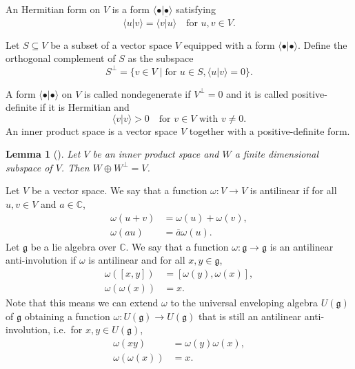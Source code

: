 \documentclass[a4paper, 12pt, reqno]{amsart}
\newtheorem{lemma}[theorem]{Lemma}
\theoremstyle{remark}
\numberwithin{equation}{subsection}
\begin{document}
An Hermitian form on $V$ is a form $\langle \bullet| \bullet\rangle$ satisfying
\begin{equation*}
  \langle u| v\rangle = \overline{\langle v| u\rangle} \quad \text{for }u, v \in V.
\end{equation*}

Let $S \subseteq V$ be a subset of a vector space $V$ equipped with a form $\langle \bullet| \bullet\rangle$.
Define the orthogonal complement of $S$ as the subspace
\begin{equation*}
  S^{\perp} = \{v \in V \mid \text{for }u\in S, \langle u| v\rangle = 0\}.
\end{equation*}

A form $\langle \bullet| \bullet\rangle$ on $V$ is called nondegenerate if $V^{\perp} = 0$ and it is called positive-definite if it is Hermitian and
\begin{equation*}
  \langle v| v\rangle > 0 \quad \text{for }v \in V \text{ with } v \neq 0.
\end{equation*}
An inner product space is a vector space $V$ together with a positive-definite form.

\begin{lemma}[{\cite[\S8.2 Theorem 5]{hoffman_linear_1971}}]
  \label{lmm:8}
  Let $V$ be an inner product space and $W$ a finite dimensional subspace of $V$.
  Then $W \oplus W^{\perp}=V$.
\end{lemma}

Let $V$ be a  vector space.
We say that a function $\omega: V \to V$ is antilinear if for all $u, v \in V$ and $a \in \mathbb{C}$,
\begin{align*}
  \omega(u + v) &= \omega(u) + \omega(v), \\
  \omega(au) &= \overline{a}\omega(u).
\end{align*}
Let $\mathfrak{g}$ be a lie algebra over $\mathbb{C}$.
We say that a function $\omega: \mathfrak{g} \to \mathfrak{g}$ is an antilinear anti-involution if $\omega$ is antilinear and for all $x, y \in \mathfrak{g}$,
\begin{align*}
  \omega([x, y]) &= [\omega(y), \omega(x)], \\
  \omega(\omega(x)) &= x.
\end{align*}
Note that this means we can extend $\omega$ to the universal enveloping algebra $U(\mathfrak{g})$ of $\mathfrak{g}$ obtaining a function $\omega: U(\mathfrak{g}) \to U(\mathfrak{g})$ that is still an antilinear anti-involution, i.e.\ for $x, y \in U(\mathfrak{g})$,
\begin{align*}
  \omega(xy) &= \omega(y)\omega(x), \\
  \omega(\omega(x)) &= x.
\end{align*}
\end{document}
